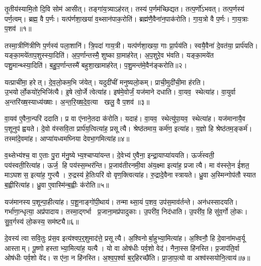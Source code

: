 \clearpage
{}
\setcounter{anuvakam}{0}
तृ॒तीय॑स्यामि॒तो दि॒वि सोम॑ आसीत्। तङ्गा॑य॒त्र्याऽह॑रत्। तस्य॑ प॒र्णम॑च्छिद्यत। तत्प॒र्णो॑ऽभवत्। तत्प॒र्णस्य॑ पर्ण॒त्वम्। ब्रह्म॒ वै प॒र्णः। यत्प॑र्णशा॒खया॑ व॒थ्सान॑पाक॒रोति॑। ब्रह्म॑णै॒वैना॑न॒पाक॑रोति। गा॒य॒त्रो वै प॒र्णः। गा॒य॒त्राः प॒शव॑॥१॥

तस्मा॒त्रीणि॑त्रीणि प॒र्णस्य॑ पला॒शानि॑। त्रि॒पदा॑ गाय॒त्री। यत्प॑र्णशा॒खया॒ गाः प्रा॒र्पय॑ति। स्वयै॒वैना॑ दे॒वत॑या॒ प्रार्प॑यति। यङ्का॒मये॑ताप॒शुस्स्या॒दिति॑। अ॒प॒र्णान्तस्मै॒ शुष्काग्रा॒माह॑रेत्। अ॒प॒शुरे॒व भ॑वति। यङ्का॒मये॑त पशु॒मान्थ्स्या॒दिति॑। ब॒हु॒प॒र्णान्तस्मै॑ बहुशा॒खामाह॑रेत्। प॒शु॒मन्त॑मे॒वैन॑ङ्करोति॥२।

यत्प्राची॑मा॒ हरेत्। दे॒व॒लो॒कम॒भि ज॑येत्। यदुदी॑चीं मनुष्यलो॒कम्। प्राची॒मुदी॑ची॒मा ह॑रति। उ॒भयोर्लो॒कयो॑र॒भिजि॑त्यै। इ॒षे त्वो॒र्जे त्वेत्या॑ह। इष॑मे॒वोर्जं॒ यज॑माने दधाति। वा॒यव॒ स्थेत्या॑ह। वा॒युर्वा अ॒न्तरि॑ख्ष॒स्याध्य॑ख्षाः। अ॒न्त॒रि॒ख्ष॒दे॒व॒त्या खलु॒ वै प॒शव॑॥३॥

वा॒यव॑ ए॒वैना॒न्परि॑ ददाति। प्र वा ए॑नाने॒तदा क॑रोति। यदाह॑। वा॒यव॒ स्थेत्यु॑पा॒यव॒ स्थेत्या॑ह। यज॑मानायै॒व प॒शूनुप॑ ह्वयते। दे॒वो व॑स्सवि॒ता प्रार्प॑य॒त्वित्या॑ह॒ प्रसूत्यै। श्रेष्ठ॑तमाय॒ कर्म॑ण॒ इत्या॑ह। य॒ज्ञो हि श्रेष्ठ॑तम॒ङ्कर्म॑। तस्मा॑दे॒वमा॑ह। आप्या॑यध्वमघ्निया देवभा॒गमित्या॑ह॥४॥

व॒थ्सेभ्य॑श्च॒ वा ए॒ताः पु॒रा म॑नु॒ष्येभ्य॒श्चाप्या॑यन्त। दे॒वेभ्य॑ ए॒वैना॒ इन्द्रा॒याप्या॑ययति। ऊर्ज॑स्वती॒ पय॑स्वती॒रित्या॑ह। ऊर्ज॒ हि पय॑स्स॒म्भर॑न्ति। प्र॒जाव॑तीरनमी॒वा अ॑य॒क्ष्मा इत्या॑ह॒ प्रजात्यै। मा व॑स्स्ते॒न ई॑शत॒ माऽघशस॒ इत्या॑ह॒ गुप्त्यै। रु॒द्रस्य॑ हे॒तिःपरि॑ वो वृण॒क्त्वित्या॑ह। रु॒द्रादे॒वैनास्त्रायते। ध्रु॒वा अ॒स्मिन्गोप॑तौ स्यात ब॒ह्वीरित्या॑ह। ध्रु॒वा ए॒वास्मि॑न्ब॒ह्वीः क॑रोति॥५॥

यज॑मानस्य प॒शून्पा॒हीत्या॑ह। प॒शू॒नाङ्गो॑पी॒थाय॑। तन्माथ्सा॒यं प॒शव॒ उप॑स॒माव॑र्तन्ते। अन॑धस्सादयति। गर्भा॑णा॒न्धृत्या॒ अप्र॑पादाय। तस्मा॒द्गर्भा प्र॒जाना॒मप्र॑पादुकाः। उ॒परी॑व॒ निद॑धाति। उ॒परी॑व॒ हि सु॑व॒र्गो लो॒कः। सु॒व॒र्गस्य॑ लो॒कस्य॒ सम॑ष्ट्यै॥६॥\anuvakamend[प॒शव॑ करोति प॒शवो॑ देवभा॒गमित्या॑ह करोति॒ नव॑ च]

दे॒वस्य॑ त्वा सवि॒तुः प्र॑स॒व इत्य॑श्वप॒र्॒शुमाद॑त्ते॒ प्रसूत्यै। अ॒श्विनोर्बा॒हुभ्या॒मित्या॑ह। अ॒श्विनौ॒ हि दे॒वाना॑मध्व॒र्यू आस्ताम्। पू॒ष्णो हस्ताभ्या॒मित्या॑ह॒ यत्यै। यो वा ओष॑धीः पर्व॒शो वेद॑। नैना॒स्स हि॑नस्ति। प्र॒जाप॑ति॒र्वा ओष॑धीः पर्व॒शो वे॑द। स ए॑ना॒ न हि॑नस्ति। अ॒श्व॒प॒र्श्वा ब॒र्॒हिरच्छै॑ति। प्रा॒जा॒प॒त्यो वा अश्व॑स्सयोनि॒त्वाय॑॥७॥


